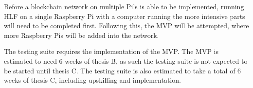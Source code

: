     Before a blockchain network on multiple Pi's is able to be implemented, running HLF on a single Raspberry Pi with a computer running the more intensive parts will need to be completed first. Following this, the MVP will be attempted, where more Raspberry Pis will be added into the network.
    
    The testing suite requires the implementation of the MVP. The MVP is estimated to need 6 weeks of thesis B, as such the testing suite is not expected to be started until thesis C. The testing suite is also estimated to take a total of 6 weeks of thesis C, including upskilling and implementation.
  
